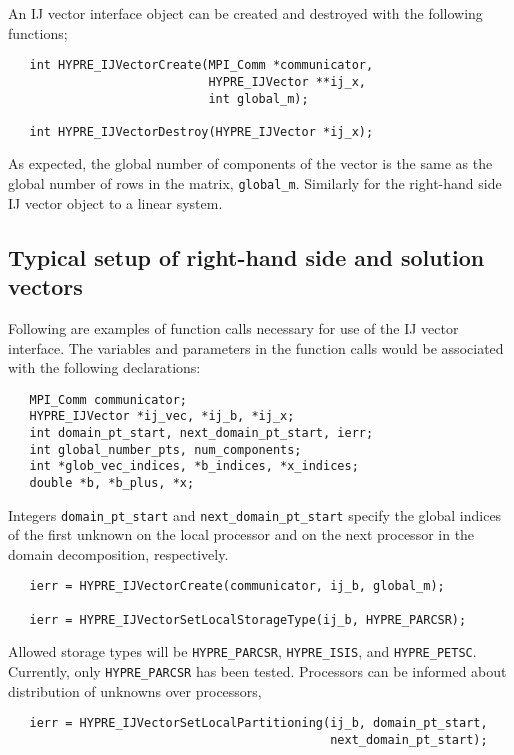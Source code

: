 An IJ vector interface object can be created and destroyed with
the following functions;
\begin{verbatim}
   int HYPRE_IJVectorCreate(MPI_Comm *communicator,
                            HYPRE_IJVector **ij_x,
                            int global_m);

   int HYPRE_IJVectorDestroy(HYPRE_IJVector *ij_x);
\end{verbatim}

\noindent As expected, the global number of components of the
vector is the same as the global number of rows in the matrix,
\verb+global_m+.
Similarly for the right-hand side IJ vector object to a linear
system.

\subsection{Typical setup of right-hand side and solution vectors}

Following are examples of function calls necessary for use of the
IJ vector interface.  The variables and parameters in the
function calls would be associated with the following declarations:

\begin{verbatim}
   MPI_Comm communicator;
   HYPRE_IJVector *ij_vec, *ij_b, *ij_x;
   int domain_pt_start, next_domain_pt_start, ierr;
   int global_number_pts, num_components;
   int *glob_vec_indices, *b_indices, *x_indices;
   double *b, *b_plus, *x;
\end{verbatim}

\noindent Integers \verb+domain_pt_start+ and \verb+next_domain_pt_start+
specify the global indices of the first unknown on the local processor
and on the next processor in the domain decomposition, respectively.

\begin{verbatim}
   ierr = HYPRE_IJVectorCreate(communicator, ij_b, global_m);

   ierr = HYPRE_IJVectorSetLocalStorageType(ij_b, HYPRE_PARCSR);
\end{verbatim}

\noindent Allowed storage types will be \verb+HYPRE_PARCSR+,
\verb+HYPRE_ISIS+, and \verb+HYPRE_PETSC+.  Currently, only
\verb+HYPRE_PARCSR+ has been tested.  Processors can be informed
about distribution of unknowns over processors,

\begin{verbatim}
   ierr = HYPRE_IJVectorSetLocalPartitioning(ij_b, domain_pt_start,
                                             next_domain_pt_start);
\end{verbatim}

